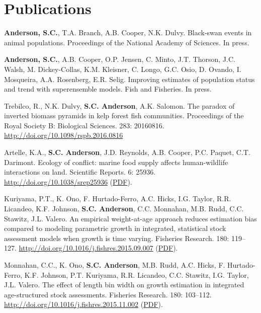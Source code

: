 \section{Publications}\label{publications}

\begin{description}
\tightlist
\item[2016]
\textbf{Anderson, S.C.}, T.A. Branch, A.B. Cooper, N.K. Dulvy.
Black-swan events in animal populations. Proceedings of the National
Academy of Sciences. In press.
\item[2016]
\textbf{Anderson, S.C.}, A.B. Cooper, O.P. Jensen, C. Minto, J.T.
Thorson, J.C. Walsh, M. Dickey-Collas, K.M. Kleisner, C. Longo, G.C.
Osio, D. Ovando, I. Mosqueira, A.A. Rosenberg, E.R. Selig. Improving
estimates of population status and trend with superensemble models. Fish
and Fisheries. In press.
\item[2016]
Trebilco, R., N.K. Dulvy, \textbf{S.C. Anderson}, A.K. Salomon. The
paradox of inverted biomass pyramids in kelp forest fish communities.
Proceedings of the Royal Society B: Biological Sciences. 283: 20160816.
\url{http://doi.org/10.1098/rspb.2016.0816}
\item[2016]
Artelle, K.A., \textbf{S.C. Anderson}, J.D. Reynolds, A.B. Cooper, P.C.
Paquet, C.T. Darimont. Ecology of conflict: marine food supply affects
human-wildlife interactions on land. Scientific Reports. 6: 25936.
\url{http://doi.org/10.1038/srep25936}
(\href{http://www.nature.com/articles/srep25936.pdf}{PDF}).
\item[2016]
Kuriyama, P.T., K. Ono, F. Hurtado-Ferro, A.C. Hicks, I.G. Taylor, R.R.
Licandeo, K.F. Johnson, \textbf{S.C. Anderson}, C.C. Monnahan, M.B.
Rudd, C.C. Stawitz, J.L. Valero. An empirical weight-at-age approach
reduces estimation bias compared to modeling parametric growth in
integrated, statistical stock assessment models when growth is time
varying. Fisheries Research. 180: 119--127.
\url{http://doi.org/10.1016/j.fishres.2015.09.007}
(\href{https://dl.dropboxusercontent.com/u/254940/papers/Kuriyama_etal_2016_empirical.pdf}{PDF}).
\item[2016]
Monnahan, C.C., K. Ono, \textbf{S.C. Anderson}, M.B. Rudd, A.C. Hicks,
F. Hurtado-Ferro, K.F. Johnson, P.T. Kuriyama, R.R. Licandeo, C.C.
Stawitz, I.G. Taylor, J.L. Valero. The effect of length bin width on
growth estimation in integrated age-structured stock assessments.
Fisheries Research. 180: 103--112.
\url{http://doi.org/10.1016/j.fishres.2015.11.002}
(\href{https://dl.dropboxusercontent.com/u/254940/papers/Monnahan_etal_2016_binwidth.pdf}{PDF}).

\end{description}
